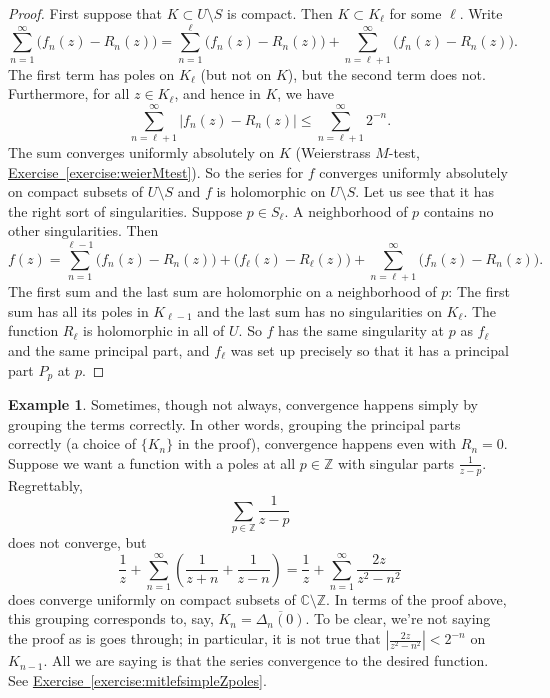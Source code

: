 \documentclass[12pt,openany]{book}
\newcommand{\abs}[1]{\left\lvert {#1} \right\rvert}
\newcommand{\C}{{\mathbb{C}}}
\newcommand{\Z}{{\mathbb{Z}}}
\theoremstyle{plain}
\theoremstyle{remark}
\theoremstyle{definition}
\theoremstyle{exercise}
\theoremstyle{example}
\newtheorem{example}[thm]{Example}
\newcommand{\exerciseref}[1]{\hyperref[#1]{Exercise~\ref*{#1}}}
\begin{document}
\begin{proof}
First suppose that $K \subset U \setminus S$ is compact.  Then $K \subset
K_\ell$ for some $\ell$.  Write
\begin{equation*}
\sum_{n=1}^\infty \bigl( f_n(z) - R_n(z) \bigr)
=
\sum_{n=1}^{\ell} \bigl( f_n(z) - R_n(z) \bigr)
+
\sum_{n=\ell+1}^\infty \bigl( f_n(z) - R_n(z) \bigr) .
\end{equation*}
The first term has poles on $K_\ell$ (but not on $K$),
but the second term does not.  Furthermore, for all $z \in K_\ell$, and
hence in $K$, we have
\begin{equation*}
\sum_{n=\ell+1}^\infty \abs{ f_n(z) - R_n(z) }
\leq
\sum_{n=\ell+1}^\infty 2^{-n} .
\end{equation*}
The sum converges uniformly absolutely on $K$ (Weierstrass $M$-test,
\exerciseref{exercise:weierMtest}).
So the series for $f$ converges uniformly absolutely
on compact subsets of $U \setminus S$ and $f$ is holomorphic on $U
\setminus S$.  Let us see that it has the right sort of singularities.
Suppose $p \in S_\ell$.  A neighborhood of $p$ contains no other
singularities.  Then
\begin{equation*}
f(z) = 
\sum_{n=1}^{\ell-1} \bigl( f_n(z) - R_n(z) \bigr)
+
\bigl( f_\ell(z) - R_\ell(z) \bigr)
+
\sum_{n=\ell+1}^\infty \bigl( f_n(z) - R_n(z) \bigr) .
\end{equation*}
The first sum and the last sum are holomorphic on a neighborhood of $p$:
The first sum has all its poles in $K_{\ell-1}$ and
the last sum has no singularities on $K_\ell$.
The function $R_\ell$ is holomorphic in all of $U$.
So $f$ has the same singularity at $p$ as $f_\ell$ and the same principal
part, and $f_\ell$ was set up precisely so that it has a principal part
$P_p$ at $p$.
\end{proof}

\begin{example} \label{example:mitlefsimpleZpoles}
Sometimes, though not always,
convergence happens simply by grouping the terms correctly.
In other words,
grouping the principal parts correctly
(a choice of $\{ K_n \}$ in the proof),
convergence happens even with $R_n=0$.
Suppose we want a function with a poles at all $p \in \Z$ with
singular parts $\frac{1}{z-p}$.  Regrettably,
\begin{equation*}
\sum_{p\in \Z} \frac{1}{z-p}
\end{equation*}
does not converge, but
\begin{equation*}
\frac{1}{z} + 
\sum_{n=1}^\infty
\left(
\frac{1}{z+n} + 
\frac{1}{z-n}
\right)
=
\frac{1}{z}
+
\sum_{n=1}^\infty
\frac{2z}{z^2-n^2}
\end{equation*}
does converge uniformly on compact subsets of $\C \setminus \Z$.
In terms of the proof above, this grouping corresponds to, say,
$K_n = \overline{\Delta_n(0)}$.
To be clear, we're not saying the proof as is goes
through; in particular, it is not true that
$\abs{\frac{2z}{z^2-n^2}} < 2^{-n}$ on $K_{n-1}$.
All we are saying is
that the series convergence to the desired function.
See \exerciseref{exercise:mitlefsimpleZpoles}.
\end{example}
\end{document}
